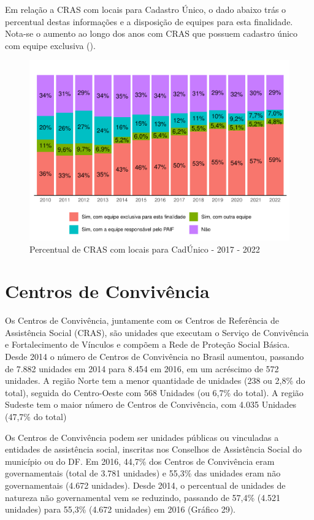 \documentclass[
  brazilian]{report}
\begin{document}
Em relação a CRAS com locais para Cadastro Único, o dado abaixo trás o
percentual destas informações e a disposição de equipes para esta
finalidade. Nota-se o aumento ao longo dos anos com CRAS que possuem
cadastro único com equipe exclusiva ().

\begin{figure}
\includegraphics{Censo-SUAS-2022_files/figure-latex/equip-cadunico-cras-1} \caption[Percentual de CRAS com locais para CadÚnico - 2017 - 2022]{Percentual de CRAS com locais para CadÚnico - 2017 - 2022}\label{fig:equip-cadunico-cras}
\end{figure}

\hypertarget{centros-de-convivuxeancia}{%
\section{Centros de Convivência}\label{centros-de-convivuxeancia}}

Os Centros de Convivência, juntamente com os Centros de Referência de
Assistência Social (CRAS), são unidades que executam o Serviço de
Convivência e Fortalecimento de Vínculos e compõem a Rede de Proteção
Social Básica. Desde 2014 o número de Centros de Convivência no Brasil
aumentou, passando de 7.882 unidades em 2014 para 8.454 em 2016, em um
acréscimo de 572 unidades. A região Norte tem a menor quantidade de
unidades (238 ou 2,8\% do total), seguida do Centro-Oeste com 568
Unidades (ou 6,7\% do total). A região Sudeste tem o maior número de
Centros de Convivência, com 4.035 Unidades (47,7\% do total)

Os Centros de Convivência podem ser unidades públicas ou vinculadas a
entidades de assistência social, inscritas nos Conselhos de Assistência
Social do município ou do DF. Em 2016, 44,7\% dos Centros de Convivência
eram governamentais (total de 3.781 unidades) e 55,3\% das unidades eram
não governamentais (4.672 unidades). Desde 2014, o percentual de
unidades de natureza não governamental vem se reduzindo, passando de
57,4\% (4.521 unidades) para 55,3\% (4.672 unidades) em 2016 (Gráfico
29).
\end{document}
